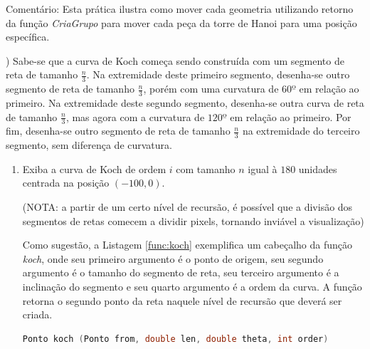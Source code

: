 \begin{renumerate}
  Comentário: Esta prática ilustra como mover cada geometria utilizando retorno da função \emph{CriaGrupo} para mover cada peça da torre de Hanoi para uma posição específica.

\item)
Sabe-se que a curva de Koch começa sendo construída com um segmento de reta de tamanho $\frac{n}{3}$. Na extremidade deste primeiro segmento, desenha-se outro segmento de reta de tamanho $\frac{n}{3}$, porém com uma curvatura de $60º$ em relação ao primeiro. Na extremidade deste segundo segmento, desenha-se outra curva de reta de tamanho $\frac{n}{3}$, mas agora com a curvatura de $120º$ em relação ao primeiro. Por fim, desenha-se outro segmento de reta de tamanho $\frac{n}{3}$ na extremidade do terceiro segmento, sem diferença de curvatura.
    \mbox{}\\
    \begin{enumerate}[label=(\alph*)]
      \item 
      Exiba a curva de Koch de ordem $i$ com tamanho $n$ igual à $180$ unidades centrada na posição $(-100, 0)$. 
        
        (NOTA: a partir de um certo nível de recursão, é possível que a divisão dos segmentos de retas comecem a dividir pixels, tornando inviável a visualização)

      Como sugestão, a Listagem \ref{func:koch} exemplifica um cabeçalho da função \emph{koch}, onde seu primeiro argumento é o ponto de origem, seu segundo argumento é o tamanho do segmento de reta, seu terceiro argumento é a inclinação do segmento e seu quarto argumento é a ordem da curva. A função retorna o segundo ponto da reta naquele nível de recursão que deverá ser criada.

      \begin{lstlisting}[caption=Header da função koch, label={func:koch},numbersep=0pt,resetmargins=true, language=C++]
      Ponto koch (Ponto from, double len, double theta, int order)
      \end{lstlisting}

        \label{ex:cap04_ex3a}


\end{enumerate}
\end{renumerate}
